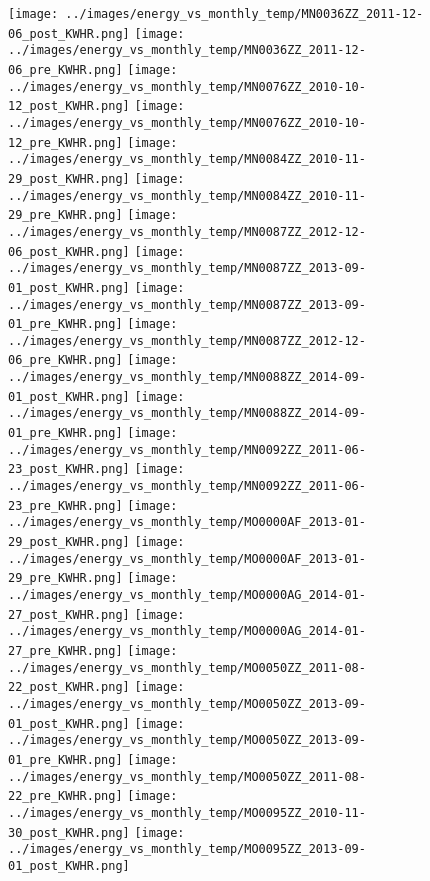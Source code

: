 \clearpage
\begin{figure}
\centering
\texttt{[image: ../images/energy\_vs\_monthly\_temp/MN0036ZZ\_2011-12-06\_post\_KWHR.png]}
\texttt{[image: ../images/energy\_vs\_monthly\_temp/MN0036ZZ\_2011-12-06\_pre\_KWHR.png]}
\texttt{[image: ../images/energy\_vs\_monthly\_temp/MN0076ZZ\_2010-10-12\_post\_KWHR.png]}
\texttt{[image: ../images/energy\_vs\_monthly\_temp/MN0076ZZ\_2010-10-12\_pre\_KWHR.png]}
\texttt{[image: ../images/energy\_vs\_monthly\_temp/MN0084ZZ\_2010-11-29\_post\_KWHR.png]}
\texttt{[image: ../images/energy\_vs\_monthly\_temp/MN0084ZZ\_2010-11-29\_pre\_KWHR.png]}
\texttt{[image: ../images/energy\_vs\_monthly\_temp/MN0087ZZ\_2012-12-06\_post\_KWHR.png]}
\texttt{[image: ../images/energy\_vs\_monthly\_temp/MN0087ZZ\_2013-09-01\_post\_KWHR.png]}
\texttt{[image: ../images/energy\_vs\_monthly\_temp/MN0087ZZ\_2013-09-01\_pre\_KWHR.png]}
\texttt{[image: ../images/energy\_vs\_monthly\_temp/MN0087ZZ\_2012-12-06\_pre\_KWHR.png]}
\texttt{[image: ../images/energy\_vs\_monthly\_temp/MN0088ZZ\_2014-09-01\_post\_KWHR.png]}
\texttt{[image: ../images/energy\_vs\_monthly\_temp/MN0088ZZ\_2014-09-01\_pre\_KWHR.png]}
\texttt{[image: ../images/energy\_vs\_monthly\_temp/MN0092ZZ\_2011-06-23\_post\_KWHR.png]}
\texttt{[image: ../images/energy\_vs\_monthly\_temp/MN0092ZZ\_2011-06-23\_pre\_KWHR.png]}
\texttt{[image: ../images/energy\_vs\_monthly\_temp/MO0000AF\_2013-01-29\_post\_KWHR.png]}
\texttt{[image: ../images/energy\_vs\_monthly\_temp/MO0000AF\_2013-01-29\_pre\_KWHR.png]}
\texttt{[image: ../images/energy\_vs\_monthly\_temp/MO0000AG\_2014-01-27\_post\_KWHR.png]}
\texttt{[image: ../images/energy\_vs\_monthly\_temp/MO0000AG\_2014-01-27\_pre\_KWHR.png]}
\texttt{[image: ../images/energy\_vs\_monthly\_temp/MO0050ZZ\_2011-08-22\_post\_KWHR.png]}
\texttt{[image: ../images/energy\_vs\_monthly\_temp/MO0050ZZ\_2013-09-01\_post\_KWHR.png]}
\texttt{[image: ../images/energy\_vs\_monthly\_temp/MO0050ZZ\_2013-09-01\_pre\_KWHR.png]}
\texttt{[image: ../images/energy\_vs\_monthly\_temp/MO0050ZZ\_2011-08-22\_pre\_KWHR.png]}
\texttt{[image: ../images/energy\_vs\_monthly\_temp/MO0095ZZ\_2010-11-30\_post\_KWHR.png]}
\texttt{[image: ../images/energy\_vs\_monthly\_temp/MO0095ZZ\_2013-09-01\_post\_KWHR.png]}
\end{figure}
